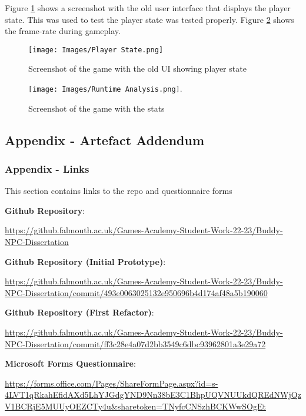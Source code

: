 \documentclass{IEEEtran}
\begin{document}
\clearpage

Figure \ref{fig:AppendixIntegrationTest} shows a screenshot with the old user interface that displays the player state. This was used to test the player state was tested properly. Figure \ref{fig:AppendixRuntimeAnalysis} shows the frame-rate during gameplay.

\begin{figure}[!h]
  \centering
  \texttt{[image: Images/Player State.png]}
  
\caption{Screenshot of the game with the old UI showing player state}
\label{fig:AppendixIntegrationTest}
\end{figure}

\begin{figure}[!h]
  \centering
  \texttt{[image: Images/Runtime Analysis.png]}.
  
\caption{Screenshot of the game with the stats}
\label{fig:AppendixRuntimeAnalysis}
\end{figure}

\clearpage

\subsection{Appendix - Artefact Addendum}
\label{AppendixArtefact}

\subsubsection{Appendix - Links}
\label{AppendixLinks}

This section contains links to the repo and questionnaire forms

\textbf{Github Repository}:

\url{https://github.falmouth.ac.uk/Games-Academy-Student-Work-22-23/Buddy-NPC-Dissertation}

\textbf{Github Repository (Initial Prototype)}:

\url{https://github.falmouth.ac.uk/Games-Academy-Student-Work-22-23/Buddy-NPC-Dissertation/commit/493e0063025132e950696b4d174af48a5b190060}

\textbf{Github Repository (First Refactor)}:

\url{https://github.falmouth.ac.uk/Games-Academy-Student-Work-22-23/Buddy-NPC-Dissertation/commit/ff3c28e4a07d2bb3549c6dbc93962801a3e29a72}

\textbf{Microsoft Forms Questionnaire}:

\url{https://forms.office.com/Pages/ShareFormPage.aspx?id=s-4LVT1qRkahEfidAXd5LhYJGdgYND9Nn38bE3C1BhpUQVNUUkdQREdNWjQzV1BCRjE5MUUyOEZCTy4u&sharetoken=TNyfcCNSzhBCKWwSOgEt}
\end{document}
